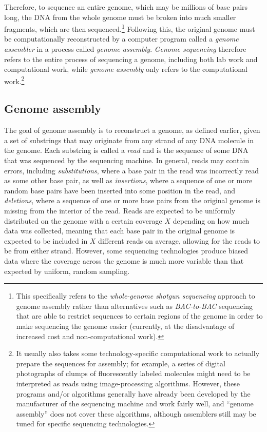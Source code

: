 \documentclass[12pt]{article}
\newcommand{\KeyTerm}[1]{{\it #1}}
\begin{document}
Therefore, to sequence an entire genome, which may be millions of base pairs
long, the DNA from the whole genome must be broken into much smaller fragments,
which are then sequenced.\footnote{This specifically refers to the
\KeyTerm{whole-genome shotgun sequencing} approach to genome assembly rather
than alternatives such as \KeyTerm{BAC-to-BAC} sequencing that are able to
restrict sequences to certain regions of the genome in order to make sequencing
the genome easier (currently, at the disadvantage of increased cost and
non-computational work).} Following this, the original genome must be
computationally reconstructed by a computer program called a \KeyTerm{genome
assembler} in a process called \KeyTerm{genome assembly}.  \KeyTerm{Genome
sequencing} therefore refers to the entire process of sequencing a genome,
including both lab work and computational work, while \KeyTerm{genome assembly}
only refers to the computational work.\footnote{It usually also takes some
technology-specific computational work to actually prepare the sequences for
assembly; for example, a series of digital photographs of clumps of
fluorescently labeled molecules might need to be interpreted as reads using
image-processing algorithms.  However, these programs and/or algorithms
generally have already been developed by the manufacturer of the sequencing
machine and work fairly well, and ``genome assembly'' does not cover these
algorithms, although assemblers still may be tuned for specific sequencing
technologies.}

\subsection{Genome assembly}

\label{subsec:reads}

The goal of genome assembly is to reconstruct a genome, as defined earlier,
given a set of substrings that may originate from any strand of any DNA molecule
in the genome.  Each substring is called a \KeyTerm{read} and is the sequence of
some DNA that was sequenced by the sequencing machine.  In general, reads may
contain errors, including \KeyTerm{substitutions}, where a base pair in the read
was incorrectly read as some other base pair, as well as \KeyTerm{insertions},
where a sequence of one or more random base pairs have been inserted into some
position in the read, and \KeyTerm{deletions}, where a sequence of one or more
base pairs from the original genome is missing from the interior of the read.
Reads are expected to be uniformly distributed on the genome with a certain
coverage $X$ depending on how much data was collected, meaning that each base
pair in the original genome is expected to be included in $X$ different reads on
average, allowing for the reads to be from either strand.  However, some
sequencing technologies produce biased data where the coverage across the genome
is much more variable than that expected by uniform, random sampling.
\end{document}
